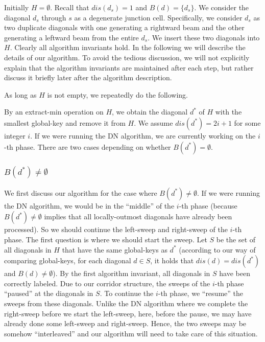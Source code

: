 \documentclass[english,runningheads,11pt]{llncs-revised}
\begin{document}
Initially $H=\emptyset$. Recall that $dis(d_s)=1$ and $B(d)=\{d_s\}$.
We consider the diagonal $d_s$ through $s$ as a degenerate junction cell. Specifically, we consider $d_s$ as two duplicate diagonals with one generating a rightward beam and the other generating a leftward beam from the entire $d_s$. We insert these two diagonals into $H$.
Clearly all algorithm invariants hold.
In the following we will describe the details of our algorithm. To
avoid the tedious discussion, we
will not explicitly explain that the algorithm invariants are
maintained after each step, but rather discuss it briefly later after the algorithm
description.

As long as $H$ is not empty, we repeatedly do the following.

By an extract-min operation on $H$, we obtain the diagonal $d^*$ of $H$ with
the smallest global-key and remove it from $H$. We assume $dis(d^*)=2i+1$ for some integer $i$.
If we were running the DN algorithm, we are currently working on the
$i$-th phase. There are two cases depending on
whether $B(d^*)=\emptyset$.

\subsubsection{$B(d^*)\neq \emptyset$}




We first discuss our algorithm for the case where $B(d^*)\neq
\emptyset$. If we were running the DN algorithm, we would be in the ``middle''
of the $i$-th phase (because $B(d^*)\neq \emptyset$ implies that all locally-outmost diagonals
have already been processed). So we
should continue the left-sweep and right-sweep of the $i$-th phase.
The first question is where we should start the sweep.
Let $S$ be the set of all diagonals in $H$ that have the same global-keys as $d^*$ (according to our way of comparing global-keys, for each diagonal $d\in S$, it holds that
$dis(d)=dis(d^*)$ and $B(d)\neq \emptyset$).
By the first algorithm invariant, all diagonals in $S$ have been correctly
labeled. Due to our corridor structure, the sweeps of the $i$-th phase
``paused'' at the diagonals in $S$. To continue the $i$-th phase, we
``resume'' the sweeps from these diagonals. Unlike the DN algorithm
where we complete the right-sweep before we start the left-sweep,
here, before the pause, we may have already done some left-sweep and
right-sweep. Hence, the two sweeps may be somehow ``interleaved'' and
our algorithm will need to take care of this situation.
\end{document}
